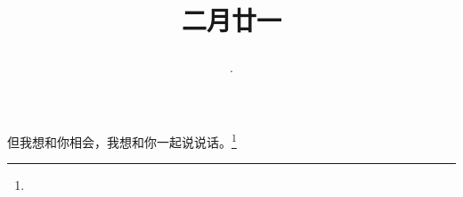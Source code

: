 \title{\date[d=30,m=3,y=2024][year:cn-y,年,month:cn,day:cn,日,·,weekday]·二月廿一 }
但我想和你相会，我想和你一起说说话。\footnote{ }

